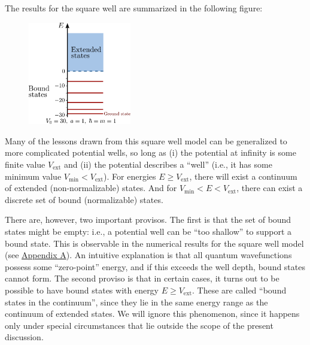 \documentclass[pra,12pt]{revtex4}
\begin{document}
The results for the square well are summarized in the following figure:

\begin{figure}[h]
  \centering\includegraphics[width=0.4\textwidth]{boundvsextended}
\end{figure}


Many of the lessons drawn from this square well model can be
generalized to more complicated potential wells, so long as (i) the
potential at infinity is some finite value $V_{\textrm{ext}}$ and (ii)
the potential describes a ``well'' (i.e., it has some minimum value
$V_{\mathrm{min}} < V_{\textrm{ext}}$).  For energies $E \ge
V_{\textrm{ext}}$, there will exist a continuum of extended
(non-normalizable) states.  And for $V_{\mathrm{min}} < E <
V_{\textrm{ext}}$, there can exist a discrete set of bound
(normalizable) states.

There are, however, two important provisos.  The first is that the set
of bound states might be empty: i.e., a potential well can be ``too
shallow'' to support a bound state.  This is observable in the
numerical results for the square well model (see
\hyperref[sec:appendix]{Appendix A}).  An intuitive explanation is
that all quantum wavefunctions possess some ``zero-point'' energy, and
if this exceeds the well depth, bound states cannot form.  The second
proviso is that in certain cases, it turns out to be possible to have
bound states with energy $E \ge V_{\textrm{ext}}$.  These are called
``bound states in the continuum'', since they lie in the same energy
range as the continuum of extended states.  We will ignore this
phenomenon, since it happens only under special circumstances that lie
outside the scope of the present discussion.
\end{document}
